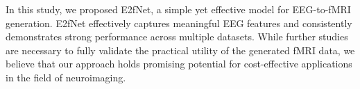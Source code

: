 In this study, we proposed E2fNet, a simple yet effective model for EEG-to-fMRI generation. 
E2fNet effectively captures meaningful EEG features and consistently demonstrates strong performance across multiple datasets. 
While further studies are necessary to fully validate the practical utility of the generated fMRI data, we believe that our approach holds promising potential for cost-effective applications in the field of neuroimaging. 